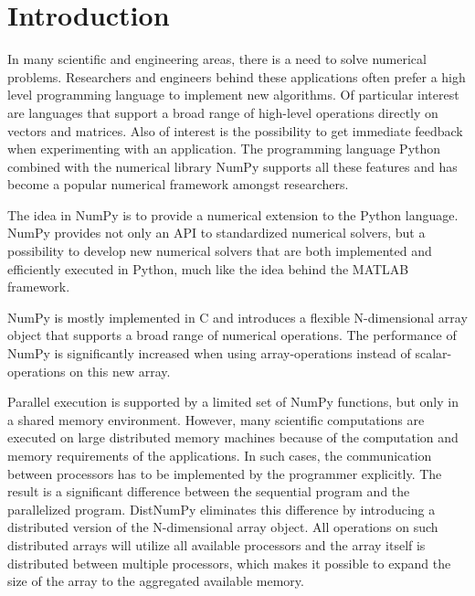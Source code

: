 \documentclass{sigplanconf}
\begin{document}
\section{Introduction}
In many scientific and engineering areas, there is a need to solve numerical problems. Researchers and engineers behind these applications often prefer a high level programming language to implement new algorithms. Of particular interest are languages that support a broad range of high-level operations directly on vectors and matrices. Also of interest is the possibility to get immediate feedback when experimenting with an application. The programming language Python combined with the numerical library NumPy\cite{numpy} supports all these features and has become a popular numerical framework amongst researchers. 

The idea in NumPy is to provide a numerical extension to the Python language. NumPy provides not only an API to standardized numerical solvers, but a possibility to develop new numerical solvers that are both implemented and efficiently executed in Python, much like the idea behind the MATLAB\cite{guide1998mathworks} framework. 

NumPy is mostly implemented in C and introduces a flexible N-dimensional array object that supports a broad range of numerical operations. The performance of NumPy is significantly increased when using array-operations instead of scalar-operations on this new array.

Parallel execution is supported by a limited set of NumPy functions, but only in a shared memory environment. However, many scientific computations are executed on large distributed memory machines because of the computation and memory requirements of the applications. In such cases, the communication between processors has to be implemented by the programmer explicitly. The result is a significant difference between the sequential program and the parallelized program. DistNumPy eliminates this difference by introducing a distributed version of the N-dimensional array object. All operations on such distributed arrays will utilize all available processors and the array itself is distributed between multiple processors, which makes it possible to expand the size of the array to the aggregated available memory.
\end{document}
